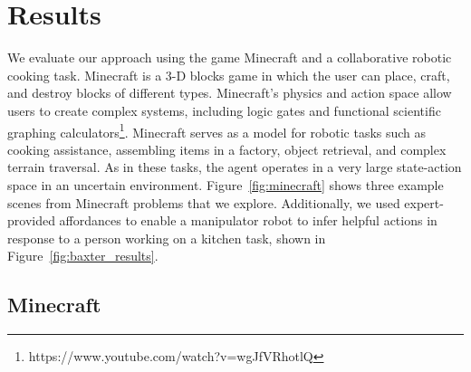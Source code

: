 \documentclass[letterpaper]{article}
\begin{document}
\section{Results}
\label{sec:results}


We evaluate our approach using the game Minecraft and a collaborative
robotic cooking task.  Minecraft is a 3-D blocks game in which the
user can place, craft, and destroy blocks of different types.
Minecraft's physics and action space allow users to create complex
systems, including logic gates and functional scientific graphing
calculators\footnote{https://www.youtube.com/watch?v=wgJfVRhotlQ}.
Minecraft serves as a model for robotic tasks such as cooking
assistance, assembling items in a factory, object retrieval, and
complex terrain traversal.  As in these tasks, the agent operates in a
very large state-action space in an uncertain environment.
Figure~\ref{fig:minecraft} shows three example scenes from Minecraft
problems that we explore.  Additionally, we used expert-provided affordances to
enable a manipulator robot to infer helpful actions in response to a
person working on a kitchen task, shown in Figure~\ref{fig:baxter_results}.

\subsection{Minecraft}
\end{document}
